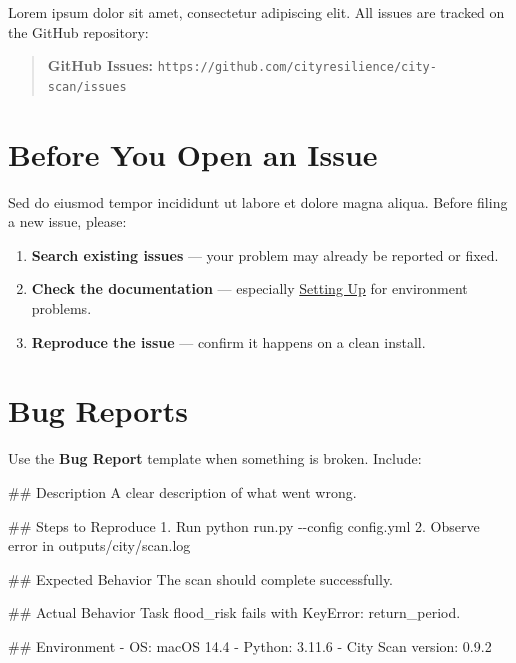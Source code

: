 \documentclass[
  letterpaper,
  DIV=11,
  numbers=noendperiod]{scrreprt}
\newenvironment{Shaded}{\begin{snugshade}}{\end{snugshade}}
\newcommand{\FunctionTok}[1]{\textcolor[rgb]{0.28,0.35,0.67}{#1}}
\newcommand{\InformationTok}[1]{\textcolor[rgb]{0.37,0.37,0.37}{#1}}
\newcommand{\NormalTok}[1]{\textcolor[rgb]{0.00,0.23,0.31}{#1}}
\newcommand{\SpecialStringTok}[1]{\textcolor[rgb]{0.13,0.47,0.30}{#1}}
\providecommand{\tightlist}{%
  \setlength{\itemsep}{0pt}\setlength{\parskip}{0pt}}
\begin{document}
Lorem ipsum dolor sit amet, consectetur adipiscing elit. All issues are
tracked on the GitHub repository:

\begin{quote}
\textbf{GitHub Issues:}
\texttt{https://github.com/cityresilience/city-scan/issues}
\end{quote}

\section{Before You Open an Issue}\label{before-you-open-an-issue}

Sed do eiusmod tempor incididunt ut labore et dolore magna aliqua.
Before filing a new issue, please:

\begin{enumerate}
\def\labelenumi{\arabic{enumi}.}
\tightlist
\item
  \textbf{Search existing issues} --- your problem may already be
  reported or fixed.
\item
  \textbf{Check the documentation} --- especially
  \hyperref[setup-instructions]{Setting Up} for environment problems.
\item
  \textbf{Reproduce the issue} --- confirm it happens on a clean
  install.
\end{enumerate}

\section{Bug Reports}\label{bug-reports}

Use the \textbf{Bug Report} template when something is broken. Include:

\begin{Shaded}
\begin{Highlighting}[]
\FunctionTok{\#\# Description}
\NormalTok{A clear description of what went wrong.}

\FunctionTok{\#\# Steps to Reproduce}
\SpecialStringTok{1. }\NormalTok{Run }\InformationTok{\textasciigrave{}python run.py {-}{-}config config.yml\textasciigrave{}}
\SpecialStringTok{2. }\NormalTok{Observe error in }\InformationTok{\textasciigrave{}outputs/city/scan.log\textasciigrave{}}

\FunctionTok{\#\# Expected Behavior}
\NormalTok{The scan should complete successfully.}

\FunctionTok{\#\# Actual Behavior}
\NormalTok{Task }\InformationTok{\textasciigrave{}flood\_risk\textasciigrave{}}\NormalTok{ fails with }\InformationTok{\textasciigrave{}KeyError: \textquotesingle{}return\_period\textquotesingle{}\textasciigrave{}}\NormalTok{.}

\FunctionTok{\#\# Environment}
\SpecialStringTok{{-} }\NormalTok{OS: macOS 14.4}
\SpecialStringTok{{-} }\NormalTok{Python: 3.11.6}
\SpecialStringTok{{-} }\NormalTok{City Scan version: 0.9.2}
\end{Highlighting}
\end{Shaded}
\end{document}
